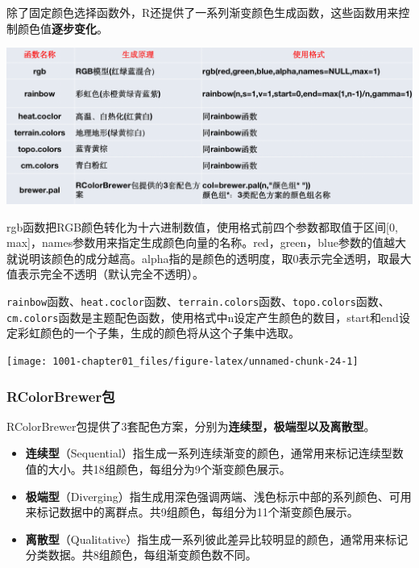 \documentclass[
]{book}
\begin{document}
除了固定颜色选择函数外，R还提供了一系列渐变颜色生成函数，这些函数用来控制颜色值\textbf{逐步变化}。

\includegraphics{figure/14.png}

rgb函数把RGB颜色转化为十六进制数值，使用格式前四个参数都取值于区间{[}0, max{]}，names参数用来指定生成颜色向量的名称。red，green，blue参数的值越大就说明该颜色的成分越高。alpha指的是颜色的透明度，取0表示完全透明，取最大值表示完全不透明（默认完全不透明）。

\texttt{rainbow}函数、\texttt{heat.coclor}函数、\texttt{terrain.colors}函数、\texttt{topo.colors}函数、\texttt{cm.colors}函数是主题配色函数，使用格式中n设定产生颜色的数目，start和end设定彩虹颜色的一个子集，生成的颜色将从这个子集中选取。

\begin{center}\texttt{[image: 1001-chapter01\_files/figure-latex/unnamed-chunk-24-1]} \end{center}

\hypertarget{rcolorbrewerux5305}{%
\subsubsection{RColorBrewer包}\label{rcolorbrewerux5305}}

RColorBrewer包提供了3套配色方案，分别为\textbf{连续型，极端型以及离散型}。

\begin{itemize}
\item
  \textbf{连续型}（Sequential）指生成一系列连续渐变的颜色，通常用来标记连续型数值的大小。共18组颜色，每组分为9个渐变颜色展示。
\item
  \textbf{极端型}（Diverging）指生成用深色强调两端、浅色标示中部的系列颜色、可用来标记数据中的离群点。共9组颜色，每组分为11个渐变颜色展示。
\item
  \textbf{离散型}（Qualitative）指生成一系列彼此差异比较明显的颜色，通常用来标记分类数据。共8组颜色，每组渐变颜色数不同。
\end{itemize}
\end{document}
